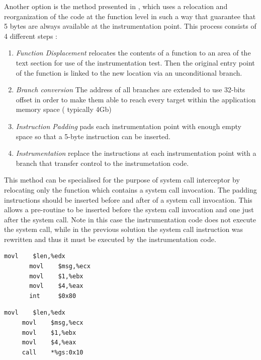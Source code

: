 Another option is the method presented in \cite{PEBIL}, which uses a relocation and reorganization of the code at the function level in such a way that guarantee that 5 bytes are always available at the instrumentation point. This process consists of 4 different steps : 

\begin{enumerate}

\item \emph{Function Displacement} relocates the contents of a function to an area of the text section for use of the instrumentation test. Then the original entry point of the 									   function is linked to the new location via an unconditional branch.   
\item \emph{Branch conversion}	   The address of all branches are extended to use 32-bits offset in order to make them able to reach every target within the application memory 									   space ( typically 4Gb)  
\item \emph{Instruction Padding}   pads each instrumentation point with enough empty space so that a 5-byte instruction can be inserted.  
\item \emph{Instrumentation}	   replace the instructions at each instrumentation point with a branch that transfer control to the instrumetation code. 

\end{enumerate}

This method can be specialised for the purpose of system call interceptor by relocating only the function which contains a system call invocation. The padding instructions should be inserted before and after of a system call invocation. This allows a pre-routine to be inserted before the system call invocation and one just after the system call. Note in this case the instrumentation code does not execute the system call, while in the previous solution the system call instruction was rewritten and thus it must be executed by the instrumentation code. 


\begin{multicols}{2}
\begin{center}
\begin{lstlisting}[caption={Original instructions}]
       movl    $len,%edx       
       movl    $msg,%ecx       
       movl    $1,%ebx        
       movl    $4,%eax         
       int 	   $0x80
\end{lstlisting}
\end{center}

\begin{center}
\begin{lstlisting}[caption={Instructions after the rewriting process}]
     movl    $len,%edx       
     movl    $msg,%ecx       
     movl    $1,%ebx        
     movl    $4,%eax         
     call    *%gs:0x10
\end{lstlisting}
\end{center}

\end{multicols}

